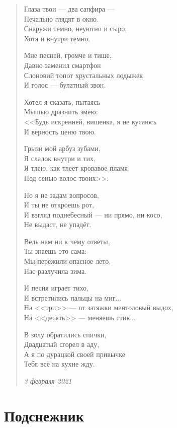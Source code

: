 \documentclass[a4paper,12pt,fleqn]{book}\usepackage{polyglossia}\setdefaultlanguage[babelshorthands=true]{russian}\setotherlanguage{english}\defaultfontfeatures{Ligatures=TeX,Mapping=tex-text}\usepackage{xcolor}\newcommand{\ml}[3]{#2}
\begin{document}
\begin{verse}
Глаза твои --- два сапфира --- \\
Печально глядят в окно. \\
Снаружи темно, неуютно и сыро, \\
Хотя и внутри темно.

Мне песней, громче и тише, \\
Давно заменил смартфон \\
Слоновий топот хрустальных лодыжек \\
И голос --- булатный звон.

Хотел я сказать, пытаясь \\
Мышью дразнить змею: \\
<<Будь искренней, вишенка, я не кусаюсь \\
И верность ценю твою.

Грызи мой арбуз зубами, \\
Я сладок внутри и тих, \\
Я тлею, как тлеет кровавое пламя \\
Под сенью волос твоих>>.

Но я не задам вопросов, \\
И ты не откроешь рот, \\
И взгляд поднебесный --- ни прямо, ни косо, \\
Не выдаст, не упадёт.

Ведь нам ни к чему ответы, \\
Ты знаешь это сама: \\
Мы пережили опасное лето, \\
Нас разлучила зима.

И песня играет тихо, \\
И встретились пальцы на миг... \\
На <<три>> --- от затяжки ментоловый выдох, \\
На <<десять>> --- меняешь стик...

В золу обратились спички, \\
Двадцатый сгорел в аду, \\
А я по дурацкой своей привычке \\
Тебя всё на кухне жду.

\emph{3 февраля 2021}
\end{verse}

\newpage
\section{Подснежник}
\end{document}
